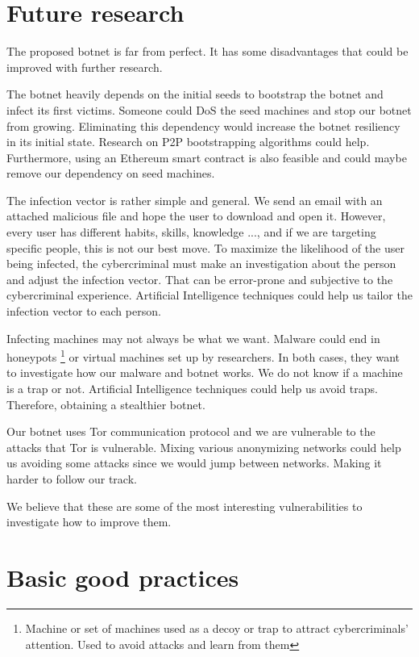 \documentclass[11pt, a4paper,twoside]{tesi_upf}
\begin{document}
\section{Future research}

The proposed botnet is far from perfect. It has some disadvantages that could be improved with further research.

The botnet heavily depends on the initial seeds to bootstrap the botnet and infect its first victims. Someone could DoS the seed machines and stop our botnet from growing. Eliminating this dependency would increase the botnet resiliency in its initial state. Research on P2P bootstrapping algorithms could help. Furthermore, using an Ethereum smart contract is also feasible \cite{blockchain-botnet} and could maybe remove our dependency on seed machines.

The infection vector is rather simple and general. We send an email with an attached malicious file and hope the user to download and open it. However, every user has different habits, skills, knowledge ..., and if we are targeting specific people, this is not our best move. To maximize the likelihood of the user being infected, the cybercriminal must make an investigation about the person and adjust the infection vector. That can be error-prone and subjective to the cybercriminal experience. Artificial Intelligence techniques could help us tailor the infection vector to each person.

Infecting machines may not always be what we want. Malware could end in honeypots \footnote{Machine or set of machines used as a decoy or trap to attract cybercriminals' attention. Used to avoid attacks and learn from them} or virtual machines set up by researchers. In both cases, they want to investigate how our malware and botnet works. We do not know if a machine is a trap or not. Artificial Intelligence techniques could help us avoid traps. Therefore, obtaining a stealthier botnet.

Our botnet uses Tor communication protocol and we are vulnerable to the attacks that Tor is vulnerable. Mixing various anonymizing networks could help us avoiding some attacks since we would jump between networks. Making it harder to follow our track.

We believe that these are some of the most interesting vulnerabilities to investigate how to improve them.

\section{Basic good practices}
\end{document}
